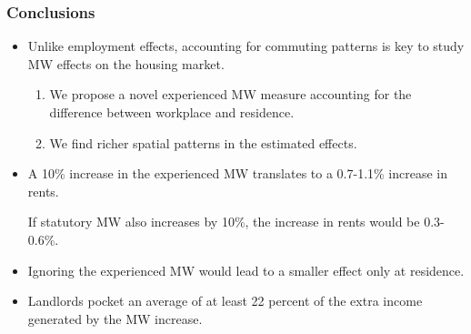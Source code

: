 \begin{frame}
	\frametitle{Conclusions}

	\begin{itemize}
		\item Unlike employment effects, accounting for commuting patterns is key to 
		study MW effects on the housing market.
		
		\vspace{.5mm} 
		\begin{enumerate}[$\Rightarrow$]
			\item We propose a novel experienced MW measure accounting for the difference 
			between workplace and residence.
			
			\vspace{.5mm} \item We find richer spatial patterns in the estimated 	
			effects.
		\end{enumerate}
		
		\pause
		\vspace{1.5mm} \item A 10\% increase in the experienced MW translates to a 
		0.7-1.1\% increase in rents.
		
		If statutory MW also increases by 10\%, the increase in rents would be 
		0.3-0.6\%.
		
		\pause
		\vspace{1.5mm} \item Ignoring the experienced MW would lead to a smaller effect 
		only at residence.
		
		\pause
		\vspace{1.5mm} \item Landlords pocket an average of at least 22 percent of the 
		extra income generated by the MW increase.
	\end{itemize}
\end{frame}

